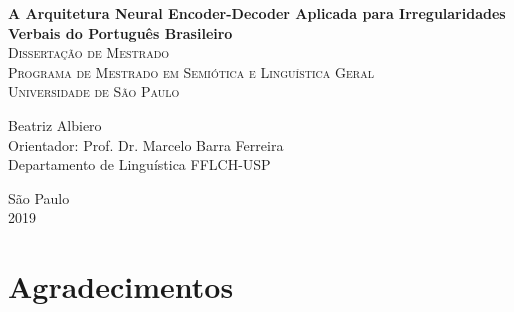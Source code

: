 \documentclass[12pt,twoside,a4paper]{book}
\begin{document}
\frontmatter 
\fancyhead[RO]{{\footnotesize\rightmark}\hspace{2em}\thepage}
\setcounter{tocdepth}{2}
\fancyhead[LE]{\thepage\hspace{2em}\footnotesize{\leftmark}}
\fancyhead[RE,LO]{}
\fancyhead[RO]{{\footnotesize\rightmark}\hspace{2em}\thepage}


\onehalfspacing  %

\thispagestyle{empty}
\begin{center}
    \vspace*{2.3cm}
    \textbf{\Large{A Arquitetura Neural Encoder-Decoder Aplicada para Irregularidades Verbais do Português Brasileiro
}}\\
    
    
    \vskip 2cm
    \textsc{
    Dissertação de Mestrado\\[+0.5cm]
    Programa de Mestrado em Semiótica e Linguística Geral\\[+0.5cm]
    Universidade de São Paulo\\[+0.5cm]
   }
    
    \vspace*{6.2cm}
    Beatriz Albiero\\
    Orientador: Prof. Dr. Marcelo Barra Ferreira\\
    Departamento de Linguística FFLCH-USP
    
    \vskip 0.5cm
    \normalsize{São Paulo\\ 2019}
\end{center}




\chapter*{Agradecimentos}

\end{document}
